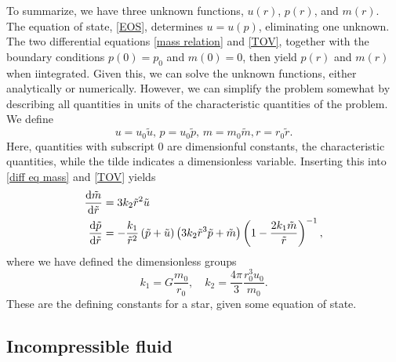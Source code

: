 To summarize, we have three unknown functions, $u(r)$, $p(r)$, and $m(r)$.
The equation of state, \autoref{EOS}, determines $u = u(p)$, eliminating one unknown.
The two differential equations \autoref{mass relation} and \autoref{TOV}, together with the boundary conditions $p(0) = p_0$ and $m(0) = 0$, then yield $p(r)$ and $m(r)$ when iintegrated.
Given this, we can solve the unknown functions, either analytically or numerically.
However, we can simplify the problem somewhat by describing all quantities in units of the characteristic quantities of the problem.
We define
%
\begin{equation}
    u = u_0 \tilde u, \, p = u_0 \tilde p, \, m =  m_0 \tilde m, r = r_0 \tilde r.
\end{equation}
%
Here, quantities with subscript $0$ are dimensionful constants, the characteristic quantities, while the tilde indicates a dimensionless variable.
Inserting this into \autoref{diff eq mass} and \autoref{TOV} yields
%
\begin{align}
    \label{mass relation dimensionless}
    \diff{ \tilde m}{\tilde r} & = 3 k_2 \tilde r^2 \tilde u \\
    \label{TOV dimensionless}
    \diff{\tilde p}{\tilde r} & 
    = - \frac{k_1}{\tilde r^2} \left(\tilde p + \tilde u\right) \left(3 k_2 \tilde r^3 \tilde p + \tilde m\right) 
    \left(1 - \frac{2 k_1  \tilde m}{\tilde r}\right)^{-1},
\end{align}
%
where we have defined the dimensionless groups
%
\begin{equation}
    \label{dimensionless groups}
    k_1 = G \frac{m_0}{r_0}, \quad k_2 =  \frac{4 \pi}{3} \frac{r_0^3 u_0}{m_0}.
\end{equation}
%
These are the defining constants for a star, given some equation of state.  



\subsection*{Incompressible fluid}

